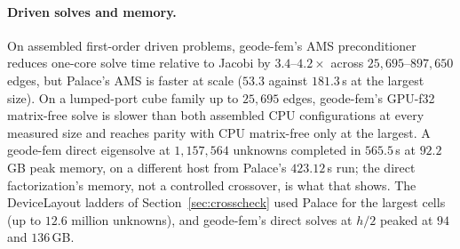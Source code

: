 \documentclass{anvil-paper}
\begin{document}
\paragraph{Driven solves and memory.}
On assembled first-order driven problems, geode-fem's AMS preconditioner
\citep{hiptmair-xu,tzaniovkolevpanayotsvassilevski2018parallel} reduces
one-core solve time relative to Jacobi by $3.4$--$4.2\times$ across
$25{,}695$--$897{,}650$ edges, but Palace's AMS is faster at scale
($53.3$ against $181.3$\,s at the largest size). On a lumped-port cube
family up to $25{,}695$ edges, geode-fem's GPU-f32 matrix-free solve is
slower than both assembled CPU configurations at every measured size and
reaches parity with CPU matrix-free only at the largest. A geode-fem
direct eigensolve at $1{,}157{,}564$ unknowns completed in $565.5$\,s at
$92.2$\,GB peak memory, on a different host from Palace's $423.12$\,s run;
the direct factorization's memory, not a controlled crossover, is what
that shows. The DeviceLayout ladders of Section~\ref{sec:crosscheck}
used Palace for the largest cells (up to $12.6$ million unknowns), and
geode-fem's direct solves at $h/2$ peaked at $94$ and $136$\,GB.

\clearpage



\end{document}

